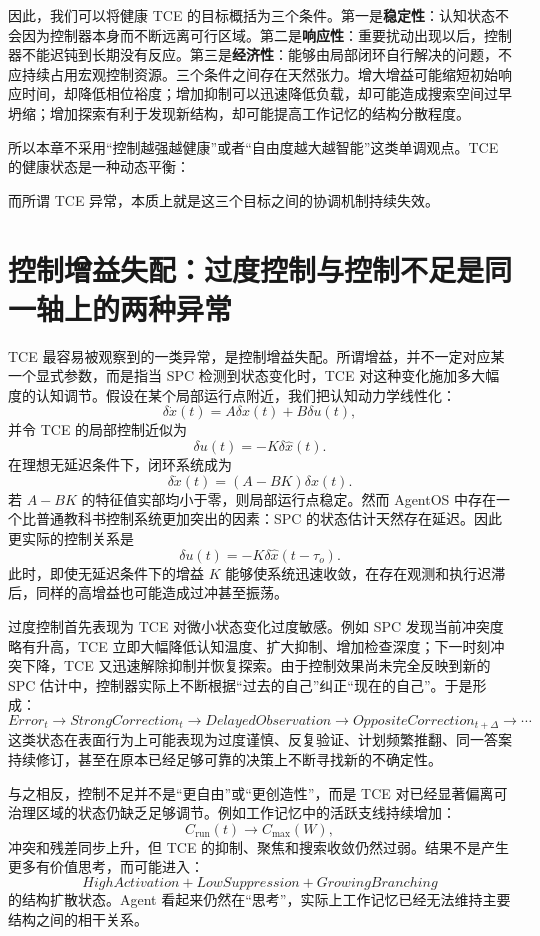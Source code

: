 因此，我们可以将健康 TCE 的目标概括为三个条件。第一是\textbf{稳定性}：认知状态不会因为控制器本身而不断远离可行区域。第二是\textbf{响应性}：重要扰动出现以后，控制器不能迟钝到长期没有反应。第三是\textbf{经济性}：能够由局部闭环自行解决的问题，不应持续占用宏观控制资源。三个条件之间存在天然张力。增大增益可能缩短初始响应时间，却降低相位裕度；增加抑制可以迅速降低负载，却可能造成搜索空间过早坍缩；增加探索有利于发现新结构，却可能提高工作记忆的结构分散程度。

所以本章不采用“控制越强越健康”或者“自由度越大越智能”这类单调观点。TCE 的健康状态是一种动态平衡：
\begin{statementbox}
\centering
{}
\end{statementbox}
而所谓 TCE 异常，本质上就是这三个目标之间的协调机制持续失效。

\section{控制增益失配：过度控制与控制不足是同一轴上的两种异常}

TCE 最容易被观察到的一类异常，是控制增益失配。所谓增益，并不一定对应某一个显式参数，而是指当 SPC 检测到状态变化时，TCE 对这种变化施加多大幅度的认知调节。假设在某个局部运行点附近，我们把认知动力学线性化：
\[
\delta\dot x(t)
=
A\delta x(t)
+
B\delta u(t),
\]
并令 TCE 的局部控制近似为
\[
\delta u(t)
=
-K\delta\hat x(t).
\]
在理想无延迟条件下，闭环系统成为
\[
\delta\dot x(t)
=
(A-BK)\delta x(t).
\]
若 \(A-BK\) 的特征值实部均小于零，则局部运行点稳定。然而 AgentOS 中存在一个比普通教科书控制系统更加突出的因素：SPC 的状态估计天然存在延迟。因此更实际的控制关系是
\[
\delta u(t)
=
-K\delta\hat x(t-\tau_o).
\]
此时，即使无延迟条件下的增益 \(K\) 能够使系统迅速收敛，在存在观测和执行迟滞后，同样的高增益也可能造成过冲甚至振荡。

过度控制首先表现为 TCE 对微小状态变化过度敏感。例如 SPC 发现当前冲突度略有升高，TCE 立即大幅降低认知温度、扩大抑制、增加检查深度；下一时刻冲突下降，TCE 又迅速解除抑制并恢复探索。由于控制效果尚未完全反映到新的 SPC 估计中，控制器实际上不断根据“过去的自己”纠正“现在的自己”。于是形成：
\[
Error_t
\rightarrow
StrongCorrection_t
\rightarrow
DelayedObservation
\rightarrow
OppositeCorrection_{t+\Delta}
\rightarrow
\cdots
\]
这类状态在表面行为上可能表现为过度谨慎、反复验证、计划频繁推翻、同一答案持续修订，甚至在原本已经足够可靠的决策上不断寻找新的不确定性。

与之相反，控制不足并不是“更自由”或“更创造性”，而是 TCE 对已经显著偏离可治理区域的状态仍缺乏足够调节。例如工作记忆中的活跃支线持续增加：
\[
C_{\mathrm{run}}(t)\rightarrow C_{\max}(W),
\]
冲突和残差同步上升，但 TCE 的抑制、聚焦和搜索收敛仍然过弱。结果不是产生更多有价值思考，而可能进入：
\[
HighActivation
+
LowSuppression
+
GrowingBranching
\]
的结构扩散状态。Agent 看起来仍然在“思考”，实际上工作记忆已经无法维持主要结构之间的相干关系。

